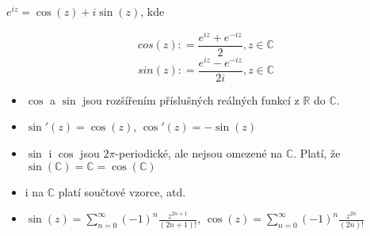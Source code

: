 $e^{i z}=\cos(z)+i\sin(z)$, kde

\begin{definition}
\[cos(z)\colon=\frac{e^{i z}+e^{-i z}}{2}, z\in \mathbb{C}\]
\[sin(z)\colon=\frac{e^{i z}-e^{-i z}}{2i}, z\in \mathbb{C}\]
\end{definition}

\begin{properties}
\begin{itemize}
    \item $\cos$ a $\sin$ jsou rozšířením příslušných reálných funkcí z $\mathbb{R}$ do $\mathbb{C}$.
    \item $\sin'(z)=\cos(z)$, $\cos'(z)=-\sin(z)$
    \item $\sin$ i $\cos$ jsou $2\pi$-periodické, ale nejsou omezené na $\mathbb{C}$. Platí, že $\sin(\mathbb{C})=\mathbb{C}=\cos(\mathbb{C})$
    \item i na $\mathbb{C}$ platí součtové vzorce, atd.
    \item $\sin(z)=\sum_{n=0}^{\infty}(-1)^n\frac{z^{2n+1}}{(2n+1)!}$, $ 
    \cos(z)=\sum_{n=0}^{\infty}(-1)^n\frac{z^{2n}}{(2n)!}$
\end{itemize}
\end{properties}


